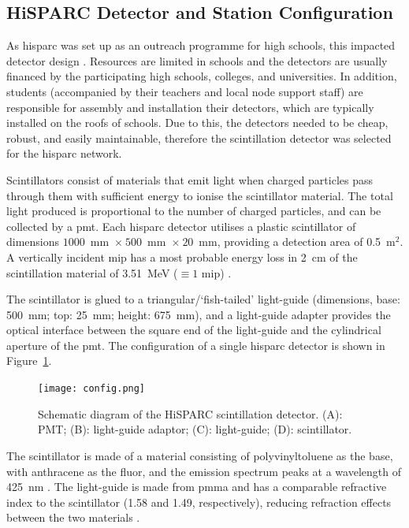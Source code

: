 \subsection{HiSPARC Detector and Station Configuration}

As \gls{hisparc} was set up as an outreach programme for high schools, this impacted detector design \citet{fokkema_hisparc_2012, van_dam_hisparc_2020}. Resources are limited in schools and the detectors are usually financed by the participating high schools, colleges, and universities. In addition, students (accompanied by their teachers and local node support staff) are responsible for assembly and installation their detectors, which are typically installed on the roofs of schools. Due to this, the detectors needed to be cheap, robust, and easily maintainable, therefore the scintillation detector was selected for the \gls{hisparc} network.

Scintillators consist of materials that emit light when charged particles pass through them with sufficient energy to ionise the scintillator material. The total light produced is proportional to the number of charged particles, and can be collected by a \gls{pmt}. Each \gls{hisparc} detector utilises a plastic scintillator of dimensions $1000$~mm~$\times~500$~mm~$\times~20$~mm, providing a detection area of 0.5~$\mathrm{m}^2$. A vertically incident \gls{mip} has a most probable energy loss in 2~cm of the scintillation material of 3.51~MeV ($\equiv 1$ \gls{mip}) \citep{van_dam_hisparc_2020}.

The scintillator is glued to a triangular/`fish-tailed' light-guide (dimensions, base: 500~mm; top: 25~mm; height: 675~mm), and a light-guide adapter provides the optical interface between the square end of the light-guide and the cylindrical aperture of the \gls{pmt}. The configuration of a single \gls{hisparc} detector is shown in Figure~\ref{fig:HS_scintillator}. 

\begin{figure}[ht!]
	\centering
	\texttt{[image: config.png]}
	\caption{Schematic diagram of the HiSPARC scintillation detector. (A): PMT; (B): light-guide adaptor; (C): light-guide; (D): scintillator.}
	\label{fig:HS_scintillator}
\end{figure}

The scintillator is made of a material consisting of polyvinyltoluene as the base, with anthracene as the fluor, and the emission spectrum peaks at a wavelength of 425~nm \citep{fokkema_hisparc_2012, bartels_hisparc_2012}. The light-guide is made from \gls{pmma} and has a comparable refractive index to the scintillator (1.58 and 1.49, respectively), reducing refraction effects between the two materials \citep{van_dam_hisparc_2020}.

